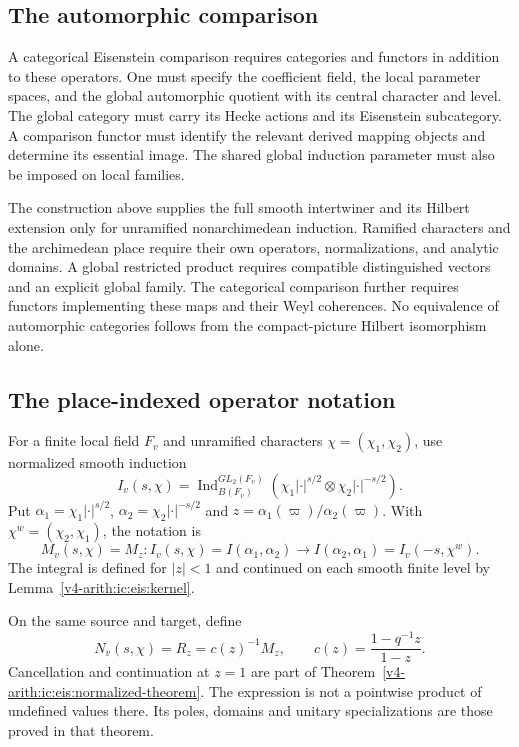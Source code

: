 \subsection{The automorphic comparison}

A categorical Eisenstein comparison requires categories and functors in
addition to these operators.
One must specify the coefficient field, the local parameter spaces,
and the global automorphic quotient with its central character and level.
The global category must carry its Hecke actions and its Eisenstein subcategory.
A comparison functor must identify the relevant derived mapping objects
and determine its essential image.
The shared global induction parameter must also be imposed on local families.

The construction above supplies the full smooth intertwiner and its Hilbert
extension only for unramified nonarchimedean induction.
Ramified characters and the archimedean place require their own operators,
normalizations, and analytic domains.
A global restricted product requires compatible distinguished vectors
and an explicit global family.
The categorical comparison further requires functors implementing these
maps and their Weyl coherences.
No equivalence of automorphic categories follows from the compact-picture
Hilbert isomorphism alone.




\subsection{The place-indexed operator notation}
\begin{definition}
\label{v4-arith:ic:w6-d:def:M-unnormalised}
For a finite local field $F_v$ and unramified characters
$\chi=(\chi_1,\chi_2)$, use normalized smooth induction
\[
 I_v(s,\chi)=\operatorname{Ind}_{B(F_v)}^{GL_2(F_v)}
       (\chi_1|\cdot|^{s/2}\otimes\chi_2|\cdot|^{-s/2}).
\]
Put
$\alpha_1=\chi_1|\cdot|^{s/2}$,
$\alpha_2=\chi_2|\cdot|^{-s/2}$ and
$z=\alpha_1(\varpi)/\alpha_2(\varpi)$.
With $\chi^w=(\chi_2,\chi_1)$, the notation is
\begin{equation}
\label{v4-arith:ic:w6-d:eq:M-unnormalised}
 M_v(s,\chi)=M_z:
 I_v(s,\chi)=I(\alpha_1,\alpha_2)
 \longrightarrow I(\alpha_2,\alpha_1)=I_v(-s,\chi^w).
\end{equation}
The integral is defined for $|z|<1$ and continued on each smooth
finite level by Lemma~\ref{v4-arith:ic:eis:kernel}.
\end{definition}
\begin{definition}
\label{v4-arith:ic:w6-d:def:N-normalised}
On the same source and target, define
\begin{equation}
\label{v4-arith:ic:w6-d:eq:N-normalised}
 N_v(s,\chi)=R_z=c(z)^{-1}M_z,
 \qquad c(z)=\frac{1-q^{-1}z}{1-z}.
\end{equation}
Cancellation and continuation at $z=1$ are part of
Theorem~\ref{v4-arith:ic:eis:normalized-theorem}. The expression is not
a pointwise product of undefined values there. Its poles, domains
and unitary specializations are those proved in that theorem.
\end{definition}


